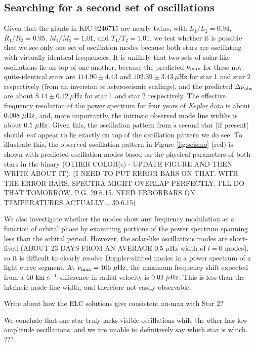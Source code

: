 \subsection{Searching for a second set of oscillations}

Given that the giants in KIC 9246715 are nearly twins, with $L_1/L_2 = 0.94$, $R_1/R_2 = 0.95$, $M_1/M_2 = 1.01$, and $T_1/T_2 = 1.01$, we test whether it is possible that we see only one set of oscillation modes because both stars are oscillating with virtually identical frequencies. It is unlikely that two sets of solar-like oscillations lie on top of one another, because the predicted $\nu_{\rm{max}}$ for these not-quite-identical stars are $114.90 \pm 4.43$ and $102.39 \pm 3.43\ \mu$Hz for star 1 and star 2 respectively (from an inversion of asteroseismic scalings), and the predicted $\Delta\nu_{\rm{obs}}$ are about $8.14 \pm 0.12 \ \mu$Hz for star 1 and star 2 respectively. The effective frequency resolution of the power spectrum for four years of \emph{Kepler} data is about $0.008 \ \mu \rm{Hz}$, and, more importantly, the intrinsic observed mode line widths is about $0.5 \ \mu \rm{Hz}$.
Given this, the oscillation pattern from a second star (if present) should \emph{not} appear to lie exactly on top of the oscillation pattern we do see. To illustrate this, the observed oscillation pattern in Figure \ref{fig:seismo} (red) is shown with predicted oscillation modes based on the physical parameters of both stars in the binary (OTHER COLOR(s) - UPDATE FIGURE AND THEN WRITE ABOUT IT). (I NEED TO PUT ERROR BARS ON THAT. WITH THE ERROR BARS, SPECTRA MIGHT OVERLAP PERFECTLY. I'LL DO THAT TOMORROW. P.G. 29.6.15. NEED ERRORBARS ON TEMPERATURES ACTUALLY... 30.6.15)

We also investigate whether the modes show any frequency modulation as a function of orbital phase by examining portions of the power spectrum spanning less than the orbital period. However, the solar-like oscillations modes are short-lived (ABOUT 23 DAYS FROM AN AVERAGE 0.5 $\mu$Hz width of $l=0$ modes), so it is difficult to clearly resolve Doppler-shifted modes in a power spectrum of a light curve segment. At $\nu_{\rm{max}} = 106 \ \mu \rm{Hz}$, the maximum frequency shift expected from a $60 \ \rm{km} \ \rm{s}^{-1}$ difference in radial velocity is $0.02 \ \mu \rm{Hz}$. This is less than the intrinsic mode line width, and therefore not easily observable.

Write about how the ELC solutions give consistent nu-max with Star 2?

We conclude that one star truly lacks visible oscillations while the other has low-amplitude oscillations, and we are unable to definitively say which star is which. ???
    
    
    
    
    
    
  
  
  
  
  
  
  
  
